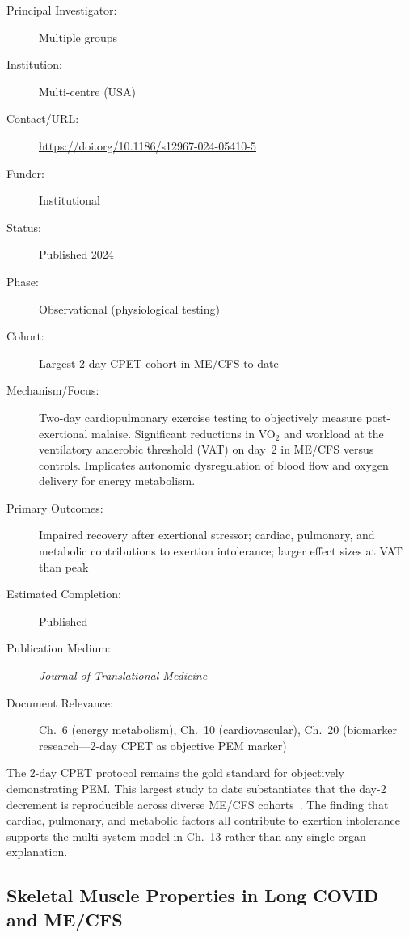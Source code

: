 \begin{description}
    \item[Principal Investigator:] Multiple groups
    \item[Institution:] Multi-centre (USA)
    \item[Contact/URL:] \url{https://doi.org/10.1186/s12967-024-05410-5}
    \item[Funder:] Institutional
    \item[Status:] Published 2024
    \item[Phase:] Observational (physiological testing)
    \item[Cohort:] Largest 2-day CPET cohort in ME/CFS to date
    \item[Mechanism/Focus:] Two-day cardiopulmonary exercise testing to
        objectively measure post-exertional malaise.  Significant reductions
        in VO$_2$ and workload at the ventilatory anaerobic threshold (VAT)
        on day~2 in ME/CFS versus controls.  Implicates autonomic
        dysregulation of blood flow and oxygen delivery for energy metabolism.
    \item[Primary Outcomes:] Impaired recovery after exertional stressor;
        cardiac, pulmonary, and metabolic contributions to exertion
        intolerance; larger effect sizes at VAT than peak
    \item[Estimated Completion:] Published
    \item[Publication Medium:] \textit{Journal of Translational Medicine}
    \item[Document Relevance:] Ch.~6 (energy metabolism), Ch.~10
        (cardiovascular), Ch.~20 (biomarker research---2-day CPET as
        objective PEM marker)
\end{description}

The 2-day CPET protocol remains the gold standard for objectively
demonstrating PEM.  This largest study to date substantiates that the
day-2 decrement is reproducible across diverse ME/CFS
cohorts~\cite{keller2024cpet}.  The finding that cardiac, pulmonary, and
metabolic factors all contribute to exertion intolerance supports the
multi-system model in Ch.~13 rather than any single-organ explanation.

\subsection{Skeletal Muscle Properties in Long COVID and ME/CFS}
\label{sec:registry-skeletal-muscle}

